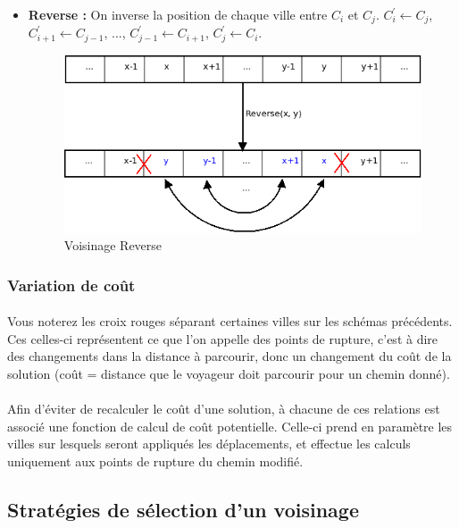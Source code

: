 \documentclass[a4paper,10pt]{report}
\begin{document}
\begin{itemize}
  \item \textbf{Reverse :} On inverse la position de chaque ville entre $C_i$ et
$C_j$. $C^{'}_i \gets C_j$, $C^{'}_{i+1} \gets C_{j-1}$, ..., $C^{'}_{j-1} \gets
C_{i+1}$, $C^{'}_j \gets C_i$.
  \begin{figure}[H]
    \begin{center}
      \includegraphics[width=\textwidth]{images/Reverse.png}
    \end{center}
    \caption{Voisinage Reverse}
  \end{figure}

\end{itemize}

\subsubsection{Variation de coût}
\paragraph{}
  Vous noterez les croix rouges séparant certaines villes sur les schémas
précédents. Ces celles-ci représentent ce que l'on appelle des points de
rupture, c'est à dire des changements dans la distance à parcourir, donc un
changement du coût de la solution (coût = distance que le voyageur doit
parcourir pour un chemin donné).
\paragraph{}
Afin d'éviter de recalculer le coût d'une solution, à chacune de ces relations
est associé une fonction de calcul de coût potentielle. Celle-ci prend en
paramètre les villes sur lesquels seront appliqués les déplacements, et effectue
les calculs uniquement aux points de rupture du chemin modifié.


\subsection{Stratégies de sélection d'un voisinage}
\end{document}
